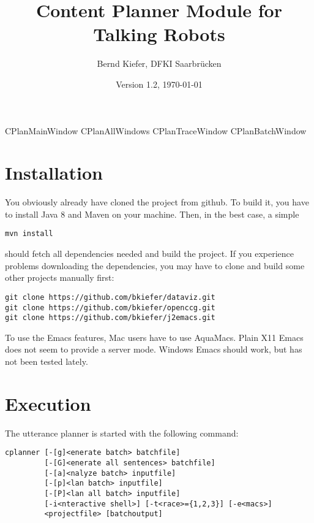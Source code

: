 \documentclass[11pt,a4paper]{report}
\title{\Large \bf Content Planner Module for Talking Robots}
\date{Version 1.2, \today}
\author{Bernd Kiefer, DFKI Saarbr\"ucken}
\begin{document}
\maketitle
\tableofcontents
\setlength{\parindent}{0em}

\newcommand{\example}{\textbf{\stepcounter{myexample}Example
    \arabic{myexample}: {}}}
{CPlanMainWindow}
{CPlanAllWindows}
{CPlanTraceWindow}
{CPlanBatchWindow}

\chapter{Installation}

You obviously already have cloned the project from github. To build it, you
have to install Java 8 and Maven on your machine. Then, in the best case,
a simple

\begin{verbatim}
mvn install
\end{verbatim}

should fetch all dependencies needed and build the project. If you experience
problems downloading the dependencies, you may have to clone and build some
other projects manually first:

\begin{verbatim}
git clone https://github.com/bkiefer/dataviz.git
git clone https://github.com/bkiefer/openccg.git
git clone https://github.com/bkiefer/j2emacs.git
\end{verbatim}

To use the Emacs features, Mac users have to use AquaMacs. Plain X11 Emacs
does not seem to provide a server mode. Windows Emacs should work, but has not
been tested lately.

\chapter{Execution}

The utterance planner is started with the following command:
\begin{verbatim}
cplanner [-[g]<enerate batch> batchfile]
         [-[G]<enerate all sentences> batchfile]
         [-[a]<nalyze batch> inputfile]
         [-[p]<lan batch> inputfile]
         [-[P]<lan all batch> inputfile]
         [-i<nteractive shell>] [-t<race>={1,2,3}] [-e<macs>]
         <projectfile> [batchoutput]
\end{verbatim}
\end{document}
